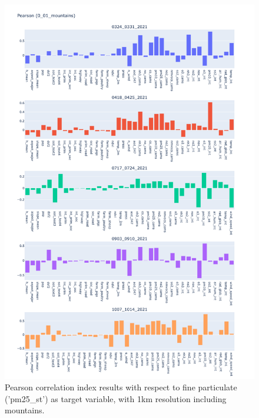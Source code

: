 \begin{figure}[H]
    \centering
    \includegraphics[scale=0.35]{images/tests/0_01_mountainspm25_st_pearson.png}
    \caption{Pearson correlation index results with respect to fine particulate ('pm25\_st') as target variable, with 1km resolution including mountains.}
    
\end{figure}
